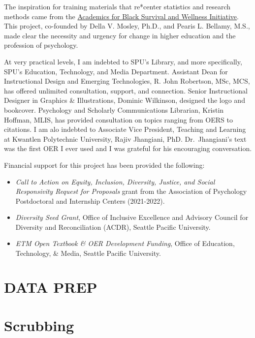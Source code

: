 \documentclass[
  11pt,
]{book}
\providecommand{\tightlist}{%
  \setlength{\itemsep}{0pt}\setlength{\parskip}{0pt}}
\begin{document}
The inspiration for training materials that re*center statistics and research methods came from the \href{https://www.academics4blacklives.com/}{Academics for Black Survival and Wellness Initiative}. This project, co-founded by Della V. Mosley, Ph.D., and Pearis L. Bellamy, M.S., made clear the necessity and urgency for change in higher education and the profession of psychology.

At very practical levels, I am indebted to SPU's Library, and more specifically, SPU's Education, Technology, and Media Department. Assistant Dean for Instructional Design and Emerging Technologies, R. John Robertson, MSc, MCS, has offered unlimited consultation, support, and connection. Senior Instructional Designer in Graphics \& Illustrations, Dominic Wilkinson, designed the logo and bookcover. Psychology and Scholarly Communications Librarian, Kristin Hoffman, MLIS, has provided consultation on topics ranging from OERS to citations. I am alo indebted to Associate Vice President, Teaching and Learning at Kwantlen Polytechnic University, Rajiv Jhangiani, PhD. Dr.~Jhangiani's text \citeyearpar{jhangiani_research_2019} was the first OER I ever used and I was grateful for his encouraging conversation.

Financial support for this project has been provided the following:

\begin{itemize}
\tightlist
\item
  \emph{Call to Action on Equity, Inclusion, Diversity, Justice, and Social Responsivity Request for Proposals} grant from the Association of Psychology Postdoctoral and Internship Centers (2021-2022).
\item
  \emph{Diversity Seed Grant}, Office of Inclusive Excellence and Advisory Council for Diversity and Reconciliation (ACDR), Seattle Pacific University.
\item
  \emph{ETM Open Textbook \& OER Development Funding}, Office of Education, Technology, \& Media, Seattle Pacific University.
\end{itemize}

\hypertarget{dataprep}{%
\chapter*{DATA PREP}\label{dataprep}}


\hypertarget{scrub}{%
\chapter{Scrubbing}\label{scrub}}
\end{document}
